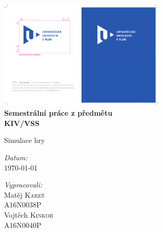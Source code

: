 \hypersetup{pageanchor=false}
\begin{titlepage}
\begin{center}


~\\[1.5cm]
\includegraphics[width=0.6\textwidth]{res/logo}
\\[0.75cm]


{ \huge \bf Semestrální práce z předmětu\\ KIV/VSS \\[0.4cm] }
{ \LARGE \sc \begin{spacing}{0.9}Simulace hry \end{spacing} }


\vfill

\begin{minipage}[b]{0.49\textwidth}
\begin{flushleft} 
\emph{Datum:}\\[1mm]
\today
\end{flushleft}
\end{minipage}
\begin{minipage}[b]{0.49\textwidth}
\begin{flushright} 
\emph{Vypracovali:}\\[1mm]
Matěj \textsc{Kareš}\\ A16N0038P\\[1mm]
Vojtěch \textsc{Kinkor}\\ A16N0040P
\end{flushright}
\end{minipage}



\end{center}
\end{titlepage}
\hypersetup{pageanchor=true}